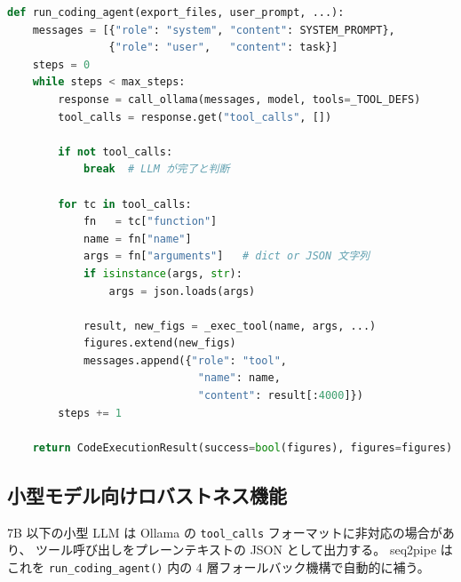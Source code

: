 \documentclass[12pt, a4paper]{article}
\begin{document}
\begin{lstlisting}[language=Python, caption={run\_coding\_agent() のツール呼び出しループ}, label={lst:loop}]
def run_coding_agent(export_files, user_prompt, ...):
    messages = [{"role": "system", "content": SYSTEM_PROMPT},
                {"role": "user",   "content": task}]
    steps = 0
    while steps < max_steps:
        response = call_ollama(messages, model, tools=_TOOL_DEFS)
        tool_calls = response.get("tool_calls", [])

        if not tool_calls:
            break  # LLM が完了と判断

        for tc in tool_calls:
            fn   = tc["function"]
            name = fn["name"]
            args = fn["arguments"]   # dict or JSON 文字列
            if isinstance(args, str):
                args = json.loads(args)

            result, new_figs = _exec_tool(name, args, ...)
            figures.extend(new_figs)
            messages.append({"role": "tool",
                              "name": name,
                              "content": result[:4000]})
        steps += 1

    return CodeExecutionResult(success=bool(figures), figures=figures)
\end{lstlisting}

\subsection{小型モデル向けロバストネス機能}

7B 以下の小型 LLM は Ollama の \texttt{tool\_calls} フォーマットに非対応の場合があり、
ツール呼び出しをプレーンテキストの JSON として出力する。
seq2pipe はこれを \texttt{run\_coding\_agent()} 内の 4 層フォールバック機構で自動的に補う。
\end{document}

